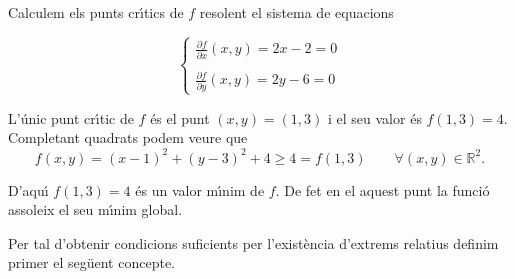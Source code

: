 \documentclass[12pt]{article}
\newcommand{\observacions}{\textbf{Observacions}\ \ }
\newtheorem{definicio}{Definici{\'o}}[subsection]
\newcommand{\R}{\mathbb{R}}
\begin{document}
Calculem els punts cr{\'\i}tics de $ f $ resolent el sistema de
equacions

\[
\begin{cases}
\frac{\partial f}{\partial x}(x,y) = 2x-2 =0\\
\\
 \frac{\partial f}{\partial y}(x,y) = 2y-6=0
\end{cases}
\]

L'{\'u}nic punt cr{\'\i}tic de $ f $ {\'e}s el punt $ (x, y) = (1,3) $ i el seu valor
{\'e}s $ f (1,3) = 4 $. Completant quadrats podem veure que
\[
f (x, y) =  (x-1) ^ 2+ (y-3) ^ 2 +4\geq 4= f (1,3) \qquad \forall
(x, y) \in \R ^ 2.
\]

D'aqu{\'\i} $ f (1,3) = 4 $ {\'e}s un valor m{\'\i}nim de $ f $. De fet en el aquest punt
la funci{\'o} assoleix el seu m{\'\i}nim global.

\vspace{0.4cm}
Per tal d'obtenir condicions suficients per l'exist{\`e}ncia d'extrems relatius definim primer el seg{\"u}ent concepte.

%
%
%
%
%
%
%
\end{document}
